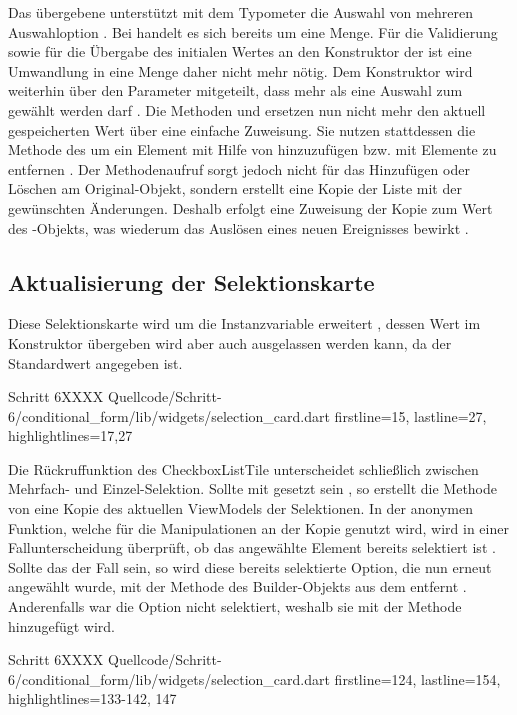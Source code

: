 Das übergebene  unterstützt mit dem Typometer  die Auswahl von mehreren Auswahloption .
Bei  handelt es sich bereits um eine Menge. Für die Validierung  sowie für die Übergabe des initialen Wertes an den Konstruktor der   ist eine Umwandlung in eine Menge daher nicht mehr nötig.
Dem Konstruktor  wird weiterhin über den Parameter  mitgeteilt, dass mehr als eine Auswahl zum gewählt werden darf .
Die Methoden  und  ersetzen nun nicht mehr den aktuell gespeicherten Wert über eine einfache Zuweisung.
Sie nutzen stattdessen die Methode  des  um ein Element mit Hilfe von  hinzuzufügen  bzw. mit  Elemente zu entfernen .
Der Methodenaufruf  sorgt jedoch nicht für das Hinzufügen oder Löschen am Original-Objekt, sondern erstellt eine Kopie der Liste mit der gewünschten Änderungen.
Deshalb erfolgt eine Zuweisung der Kopie zum Wert des -Objekts, was wiederum das Auslösen eines neuen Ereignisses bewirkt .

\subsection{Aktualisierung der Selektionskarte}


Diese Selektionskarte wird um die Instanzvariable  erweitert ,
dessen Wert im Konstruktor übergeben wird  aber auch ausgelassen werden kann, da der Standardwert  angegeben ist.

\begin{alexlisting}{Schritt 6}{XXXX}
  {Quellcode/Schritt-6/conditional_form/lib/widgets/selection_card.dart}
  {firstline=15, lastline=27, highlightlines={17,27}}
  \label{lst:Schritt6SelectionCard}
\end{alexlisting}


Die Rückruffunktion  des CheckboxListTile unterscheidet schließlich zwischen Mehrfach- und Einzel-Selektion.
Sollte  mit  gesetzt sein , so erstellt die Methode  von  eine Kopie des aktuellen ViewModels der Selektionen.
In der anonymen Funktion,
welche für die Manipulationen an der Kopie genutzt wird,
wird in einer Fallunterscheidung überprüft,
ob das angewählte Element bereits selektiert ist .
Sollte das der Fall sein,
so wird diese bereits selektierte Option, die nun erneut angewählt wurde, mit der Methode  des Builder-Objekts aus dem  entfernt .
Anderenfalls war die Option nicht selektiert, weshalb sie mit der Methode  hinzugefügt wird. 


\begin{alexlisting}{Schritt 6}{XXXX}
  {Quellcode/Schritt-6/conditional_form/lib/widgets/selection_card.dart}
  {firstline=124, lastline=154, highlightlines={133-142, 147}}
  \label{lst:Schritt6XXXX}
\end{alexlisting}

\ifincludeall \clearpage \fi
